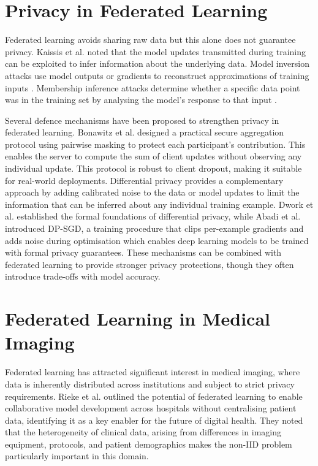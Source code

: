 \documentclass[12pt,openany,a4paper]{book}
\begin{document}
\section{Privacy in Federated Learning}
Federated learning avoids sharing raw data but this alone does not guarantee privacy. Kaissis et al. \cite{kaissisSecurePrivacypreservingFederated2020} noted that the model updates transmitted during training can be exploited to infer information about the underlying data. Model inversion attacks use model outputs or gradients to reconstruct approximations of training inputs \cite{fredriksonModelInversionAttacks2015}. Membership inference attacks determine whether a specific data point was in the training set by analysing the model's response to that input \cite{shokriMembershipInferenceAttacks2017}.

Several defence mechanisms have been proposed to strengthen privacy in federated learning. Bonawitz et al. \cite{bonawitzPracticalSecureAggregation2017} designed a practical secure aggregation protocol using pairwise masking to protect each participant's contribution. This enables the server to compute the sum of client updates without observing any individual update. This protocol is robust to client dropout, making it suitable for real-world deployments. Differential privacy provides a complementary approach by adding calibrated noise to the data or model updates to limit the information that can be inferred about any individual training example. Dwork et al. \cite{dworkCalibratingNoiseSensitivity2006} established the formal foundations of differential privacy, while Abadi et al. \cite{abadiDeepLearningDifferential2016} introduced DP-SGD, a training procedure that clips per-example gradients and adds noise during optimisation which enables deep learning models to be trained with formal privacy guarantees. These mechanisms can be combined with federated learning to provide stronger privacy protections, though they often introduce trade-offs with model accuracy.

\section{Federated Learning in Medical Imaging}
Federated learning has attracted significant interest in medical imaging, where data is inherently distributed across institutions and subject to strict privacy requirements. Rieke et al. \cite{riekeFutureDigitalHealth2020} outlined the potential of federated learning to enable collaborative model development across hospitals without centralising patient data, identifying it as a key enabler for the future of digital health. They noted that the heterogeneity of clinical data, arising from differences in imaging equipment, protocols, and patient demographics makes the non-IID problem particularly important in this domain.
\end{document}
